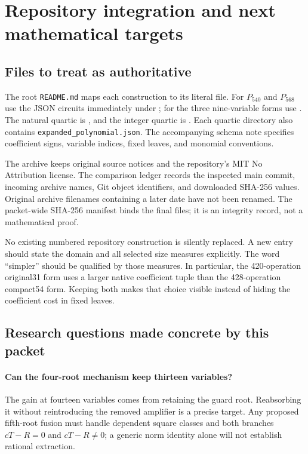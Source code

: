 \documentclass[11pt,a4paper]{article}
\theoremstyle{definition}
\begin{document}
\section{Repository integration and next mathematical targets}
\label{sec:next}

\subsection{Files to treat as authoritative}

The root \texttt{README.md} maps each construction to its literal file.
For $P_{540}$ and $P_{568}$ use the JSON circuits immediately under
; for the three nine-variable forms use
. The natural quartic is
, and the integer quartic is
. Each quartic directory also contains
\texttt{expanded\_polynomial.json}. The accompanying schema note specifies
coefficient signs, variable indices, fixed leaves, and monomial conventions.

The archive keeps original source notices and the repository's MIT No
Attribution license. The comparison ledger records the inspected main
commit, incoming archive names, Git object identifiers, and downloaded
SHA-256 values. Original archive filenames containing a later date have
not been renamed. The packet-wide SHA-256 manifest binds the final files;
it is an integrity record, not a mathematical proof.

No existing numbered repository construction is silently replaced. A new
entry should state the domain and all selected size measures explicitly.
The word ``simpler'' should be qualified by those measures. In particular,
the 420-operation original31 form uses a larger native coefficient tuple
than the 428-operation compact54 form. Keeping both makes that choice
visible instead of hiding the coefficient cost in fixed leaves.

\subsection{Research questions made concrete by this packet}

\paragraph{Can the four-root mechanism keep thirteen variables?}
The gain at fourteen variables comes from retaining the guard root.
Reabsorbing it without reintroducing the removed amplifier is a precise
target. Any proposed fifth-root fusion must handle dependent square
classes and both branches $cT-R=0$ and $cT-R\ne0$; a generic norm identity
alone will not establish rational extraction.
\end{document}
